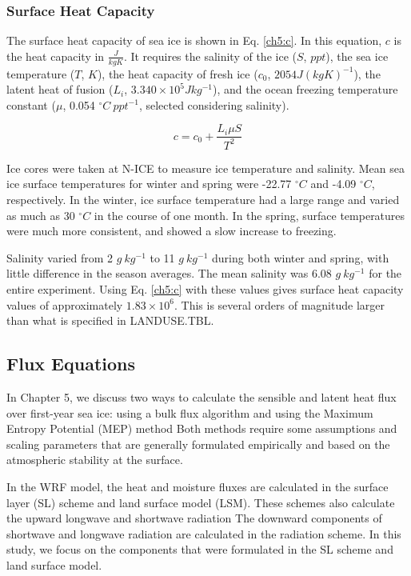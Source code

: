 \subsubsection{Surface Heat Capacity}

The surface heat capacity of sea ice is shown in Eq. \ref{ch5:c}. In this equation, $c$ is the heat capacity in $\frac{J}{kg K}$. It requires the salinity of the ice ($S$, $ppt$), the sea ice temperature ($T$, $K$), the heat capacity of fresh ice ($c_{0}$, $2054 J(kg K)^{-1}$), the latent heat of fusion ($L_{i}$, $3.340 \times 10^{5} Jkg^{-1}$), and the ocean freezing temperature constant ($\mu$, 0.054 $^{\circ}C~ppt^{-1}$, selected considering salinity). 

\begin{equation}\label{ch5:c}
c = c_{0} + \frac{L_{i}\mu S}{T^{2}}
\end{equation}

Ice cores were taken at N-ICE to measure ice temperature and salinity. Mean sea ice surface temperatures for winter and spring were -22.77 $^{\circ}C$ and -4.09 $^{\circ}C$, respectively. In the winter, ice surface temperature had a large range and varied as much as 30 $^{\circ}C$ in the course of one month. In the spring, surface temperatures were much more consistent, and showed a slow increase to freezing.

Salinity varied from 2 $g~kg^{-1}$ to 11 $g~kg^{-1}$ during both winter and spring, with little difference in the season averages. The mean salinity was 6.08 $g~kg^{-1}$ for the entire experiment. Using Eq. \ref{ch5:c} with these values gives surface heat capacity values of approximately $1.83 \times 10^{6}$. This is several orders of magnitude larger than what is specified in LANDUSE.TBL.

\subsection{Flux Equations}

In Chapter 5, we discuss two ways to calculate the sensible and latent heat flux over first-year sea ice: using a bulk flux algorithm \citep{foken:2008} and using the Maximum Entropy Potential (MEP) method \citep{zhang:2021, wang:2014, wang:2009} Both methods require some assumptions and scaling parameters that are generally formulated empirically and based on the atmospheric stability at the surface. 

In the WRF model, the heat and moisture fluxes are calculated in the surface layer (SL) scheme and land surface model (LSM). These schemes also calculate the upward longwave and shortwave radiation \citep{dudhia:2014, skamarock:2019} The downward components of shortwave and longwave radiation are calculated in the radiation scheme. In this study, we focus on the components that were formulated in the SL scheme and land surface model. 

